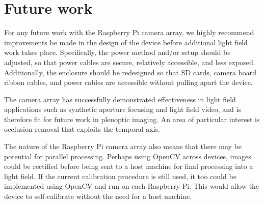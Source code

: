 \documentclass[../main.tex]{subfiles}
\begin{document}
\section{Future work} \label{sec:future-work}
For any future work with the Raspberry Pi camera array, we highly recommend improvements be made in the design of the device before additional light field work takes place. Specifically, the power method and/or setup should be adjusted, so that power cables are secure, relatively accessible, and less exposed. Additionally, the enclosure should be redesigned so that SD cards, camera board ribbon cables, and power cables are accessible without pulling apart the device.

The camera array has successfully demonstrated effectiveness in light field applications such as synthetic aperture focusing and light field video, and is therefore fit for future work in plenoptic imaging. An area of particular interest is occlusion removal that exploits the temporal axis.

The nature of the Raspberry Pi camera array also means that there may be potential for parallel processing. Perhaps using OpenCV across devices, images could be rectified before being sent to a host machine for final processing into a light field. If the current calibration procedure is still used, it too could be implemented using OpenCV and run on each Raspberry Pi. This would allow the device to self-calibrate without the need for a host machine.  
\end{document}
